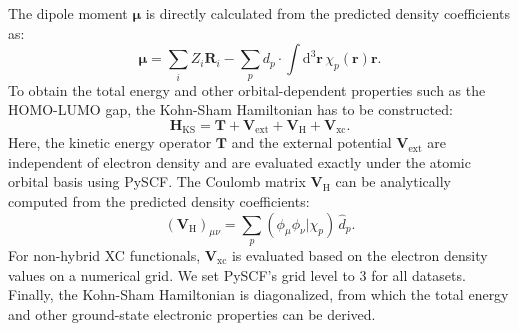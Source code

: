 \documentclass[%
reprint,
superscriptaddress,
bibnotes,
amsmath,amssymb,
aps,
floatfix, %
]{revtex4-2}
\begin{document}
\noindent The dipole moment $\bm{\mu}$ is directly calculated from the predicted density coefficients as:
\begin{equation}
  \bm{\mu} = \sum_i Z_i \bm{R}_i - \sum_p d_p \cdot\int \mathrm{d}^3 \bm{r} \,\chi_p(\bm{r}) \bm{r}.
\end{equation}
To obtain the total energy and other orbital-dependent properties such as the HOMO-LUMO gap, the Kohn-Sham Hamiltonian has to be constructed:
\begin{equation}
  \mathbf{H}_\text{KS} = \mathbf{T} + \mathbf{V}_\text{ext} + \mathbf{V}_\text{H} + \mathbf{V}_\text{xc}.
\end{equation}
Here, the kinetic energy operator $\mathbf{T}$ and the external potential $\mathbf{V}_\text{ext}$ are independent of electron density and are evaluated exactly under the atomic orbital basis using PySCF. The Coulomb matrix $\mathbf{V}_\text{H}$ can be analytically computed from the predicted density coefficients:
\begin{equation}
  (\mathbf{V}_\text{H})_{\mu\nu} = \sum_p (\phi_\mu \phi_\nu | \chi_p) \,  \hat{d}_p.
\end{equation}
For non-hybrid XC functionals, $\mathbf{V}_\text{xc}$ is evaluated based on the electron density values on a numerical grid. We set PySCF's grid level to 3 for all datasets. Finally, the Kohn-Sham Hamiltonian is diagonalized, from which the total energy and other ground-state electronic properties can be derived.
\end{document}
